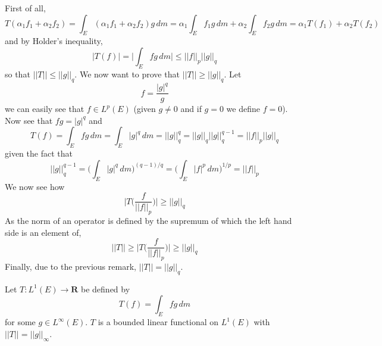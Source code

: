 \vspace{2ex}
\begin{rmk}
First of all, 
\[T(\alpha_1f_1+\alpha_2f_2)=\int _{E}(\alpha_1f_1+\alpha_2f_2)g\,d m=\alpha_1\int _{E}f_1g\,d m+\alpha_2\int _{E}f_2g\,d m=\alpha_1T(f_1)+\alpha_2T(f_2)\]
and by Holder's inequality, 
\[|T(f)|=\Big|\int _{E}fg\,d m\Big|\leq ||f||_{p}||g||_{q}\]
so that $||T||\leq ||g||_{q}$. We now want to prove that $||T||\geq ||g||_{q}$. Let
\[f=\dfrac{|g|^{q}}{g}\]
we can easily see that $f\in L^{p}(E)$ (given $g\ne 0$ and if $g=0$ we define $f=0$). Now see that $fg=|g|^{q}$ and 
\[T(f)=\int _{E}fg\, dm=\int _{E}|g|^{q}\,d m=||g||_{q}^{q}=||g||_{q}||g||_{q}^{q-1}=||f||_{p}||g||_{q}\]
given the fact that
\[||g||^{q-1}_{q}=\Big(\int _{E}|g|^{q}\,d m\Big)^{(q-1)/q}=\Big(\int _{E}|f|^{p}\,d m\Big)^{1/p}=||f||_{p}\]
We now see how
\[\Big|T\Big(\dfrac{f}{||f||_{p}}\Big)\Big|\geq ||g||_{q}\]
As the norm of an operator is defined by the supremum of which the left hand side is an element of,
\[||T||\geq \Big|T\Big(\dfrac{f}{||f||_{p}}\Big)\Big| \geq ||g||_{q}\]
Finally, due to the previous remark, $||T||=||g||_{q}$. 
\end{rmk}
\vspace{2ex}

\begin{cor}
Let $T:L^{1}(E)\rightarrow {\bm R}$ be defined by
\[T(f)=\int _{E}fg\,d m\]
for some $g\in L^{\infty }(E)$. $T$ is a bounded linear functional on $L^{1}(E)$ with $||T||=||g||_{\infty }$.
\end{cor}
\vspace{2ex}

